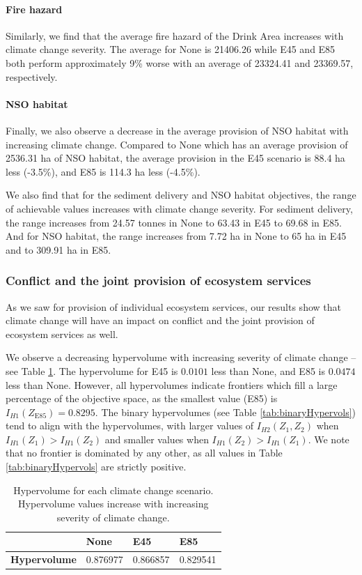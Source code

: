\paragraph{Fire hazard}
Similarly, we find that the average fire hazard of the Drink Area increases with climate change severity. The average for None is 21406.26 while E45 and E85 both perform approximately 9\% worse with an average of 23324.41 and 23369.57, respectively.

\paragraph{NSO habitat}
Finally, we also observe a decrease in the average provision of NSO habitat with increasing climate change. Compared to None which has an average provision of 2536.31 ha of NSO habitat, the average provision in the E45 scenario is 88.4 ha less (-3.5\%), and E85 is 114.3 ha less (-4.5\%).

We also find that for the sediment delivery and NSO habitat objectives, the range of achievable values increases with climate change severity. For sediment delivery, the range increases from 24.57 tonnes in None to 63.43 in E45 to 69.68 in E85. And for NSO habitat, the range increases from 7.72 ha in None to 65 ha in E45 and to 309.91 ha in E85.

\subsubsection{Conflict and the joint provision of ecosystem services}
As we saw for provision of individual ecosystem services, our results show that climate change will have an impact on conflict and the joint provision of ecosystem services as well.

We observe a decreasing hypervolume with increasing severity of climate change -- see Table \ref{tab:hypervols}. The hypervolume for E45 is $0.0101$ less than None, and E85 is $0.0474$ less than None. However, all hypervolumes indicate frontiers which fill a large percentage of the objective space, as the smallest value (E85) is $I_{H1}(Z_\text{E85}) = 0.8295$. The binary hypervolumes (see Table \ref{tab:binaryHypervols}) tend to align with the hypervolumes, with larger values of $I_{H2}(Z_1,Z_2)$ when $I_{H1}(Z_1) > I_{H1}(Z_2)$ and smaller values when $I_{H1}(Z_2) > I_{H1}(Z_1)$. We note that no frontier is dominated by any other, as all values in Table \ref{tab:binaryHypervols} are strictly positive.

\begin{table}[]
\centering
\caption[Hypervolumes of the efficient frontiers]{Hypervolume for each climate change scenario. Hypervolume values increase with increasing severity of climate change.}
\label{tab:hypervols}
\begin{tabular}{lllll}
\multicolumn{2}{l|}{}                                                  & \textbf{None} & \textbf{E45} & \textbf{E85} \\ \hline
\multicolumn{2}{l|}{\textbf{Hypervolume}}                              & 0.876977      & 0.866857     & 0.829541       
\end{tabular}
\end{table} 

